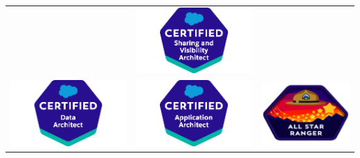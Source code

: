 \documentclass[a4paper, oneside, final]{scrartcl} %
\begin{document}
\begin{center}
\begin{table}[H]
\begin{tabular}{ccc}
                    & \includegraphics[width=0.2\linewidth]{svd.png}\\[-4pt]
                     \includegraphics[width=0.2\linewidth]{da.png}
                    &  \includegraphics[width=0.2\linewidth]{aa.png}
                    & \includegraphics[width=0.2\linewidth]{asr.png}\\[-4pt]
                \end{tabular}%
        \end{table}



\end{center}
\end{document}

